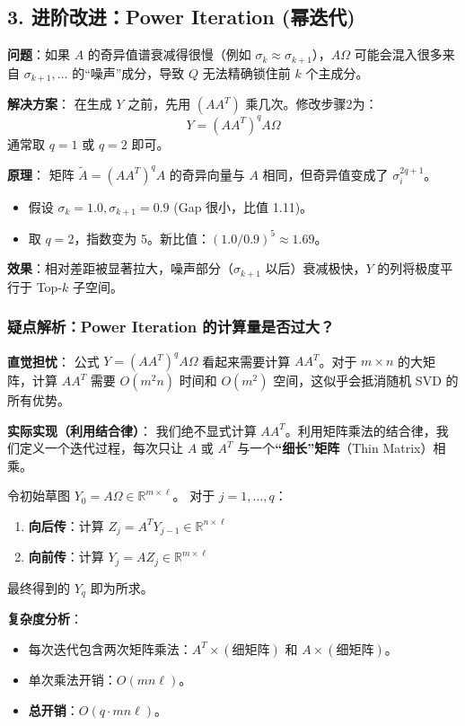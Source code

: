 \documentclass[11pt,a4paper]{ctexart}
\theoremstyle{definition}
\theoremstyle{remark}
\begin{document}
\subsection{3. 进阶改进：Power Iteration (幂迭代)}

\textbf{问题}：如果 $A$ 的奇异值谱衰减得很慢（例如 $\sigma_k \approx \sigma_{k+1}$），$A\Omega$ 可能会混入很多来自 $\sigma_{k+1}, \dots$ 的“噪声”成分，导致 $Q$ 无法精确锁住前 $k$ 个主成分。

\textbf{解决方案}：
在生成 $Y$ 之前，先用 $(AA^T)$ 乘几次。修改步骤2为：
\[
Y = (AA^T)^q A \Omega
\]
通常取 $q=1$ 或 $q=2$ 即可。

\textbf{原理}：
矩阵 $\tilde{A} = (AA^T)^q A$ 的奇异向量与 $A$ 相同，但奇异值变成了 $\sigma_i^{2q+1}$。
\begin{itemize}
    \item 假设 $\sigma_k = 1.0, \sigma_{k+1} = 0.9$ (Gap 很小，比值 1.11)。
    \item 取 $q=2$，指数变为 5。新比值：$(1.0/0.9)^5 \approx 1.69$。
\end{itemize}
\textbf{效果}：相对差距被显著拉大，噪声部分（$\sigma_{k+1}$ 以后）衰减极快，$Y$ 的列将极度平行于 Top-$k$ 子空间。



\subsubsection*{疑点解析：Power Iteration 的计算量是否过大？}

\textbf{直觉担忧}：
公式 $Y = (AA^T)^q A \Omega$ 看起来需要计算 $AA^T$。对于 $m \times n$ 的大矩阵，计算 $AA^T$ 需要 $O(m^2 n)$ 时间和 $O(m^2)$ 空间，这似乎会抵消随机 SVD 的所有优势。

\textbf{实际实现（利用结合律）}：
我们绝不显式计算 $AA^T$。利用矩阵乘法的结合律，我们定义一个迭代过程，每次只让 $A$ 或 $A^T$ 与一个\textbf{“细长”矩阵}（Thin Matrix）相乘。

令初始草图 $Y_0 = A\Omega \in \mathbb{R}^{m \times \ell}$。
对于 $j = 1, \dots, q$：
\begin{enumerate}
    \item \textbf{向后传}：计算 $Z_j = A^T Y_{j-1} \in \mathbb{R}^{n \times \ell}$
    \item \textbf{向前传}：计算 $Y_j = A Z_j \in \mathbb{R}^{m \times \ell}$
\end{enumerate}
最终得到的 $Y_q$ 即为所求。

\textbf{复杂度分析}：
\begin{itemize}
    \item 每次迭代包含两次矩阵乘法：$A^T \times (\text{细矩阵})$ 和 $A \times (\text{细矩阵})$。
    \item 单次乘法开销：$O(mn\ell)$。
    \item \textbf{总开销}：$O(q \cdot mn\ell)$。
\end{itemize}
\end{document}
